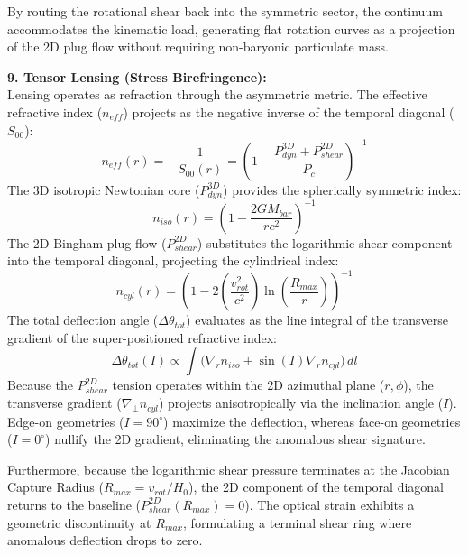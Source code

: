 By routing the rotational shear back into the symmetric sector, the continuum accommodates the kinematic load, generating flat rotation curves as a projection of the 2D plug flow without requiring non-baryonic particulate mass.

\vspace{0.2 cm}

\textbf{9. Tensor Lensing (Stress Birefringence):} \\ 
Lensing operates as refraction through the asymmetric metric. The effective refractive index ($n_{eff}$) projects as the negative inverse of the temporal diagonal ($S_{00}$):
\begin{equation}
    n_{eff}(r) = -\frac{1}{S_{00}(r)} = \left( 1 - \frac{P_{dyn}^{3D} + P_{shear}^{2D}}{P_c} \right)^{-1}
\end{equation}
The 3D isotropic Newtonian core ($P_{dyn}^{3D}$) provides the spherically symmetric index:
\begin{equation}
    n_{iso}(r) = \left( 1 - \frac{2G M_{bar}}{r c^2} \right)^{-1}
\end{equation}
The 2D Bingham plug flow ($P_{shear}^{2D}$) substitutes the logarithmic shear component into the temporal diagonal, projecting the cylindrical index:
\begin{equation}
    n_{cyl}(r) = \left( 1 - 2\left(\frac{v_{rot}^2}{c^2}\right) \ln \left( \frac{R_{max}}{r} \right) \right)^{-1}
\end{equation}
The total deflection angle ($\Delta \theta_{tot}$) evaluates as the line integral of the transverse gradient of the super-positioned refractive index:
\begin{equation}
    \Delta \theta_{tot}(I) \propto \int \Big( \nabla_r n_{iso} + \sin(I) \nabla_r n_{cyl} \Big) \, dl
\end{equation}
Because the $P_{shear}^{2D}$ tension operates within the 2D azimuthal plane ($r, \phi$), the transverse gradient ($\nabla_\perp n_{cyl}$) projects anisotropically via the inclination angle ($I$). Edge-on geometries ($I=90^\circ$) maximize the deflection, whereas face-on geometries ($I=0^\circ$) nullify the 2D gradient, eliminating the anomalous shear signature. 

Furthermore, because the logarithmic shear pressure terminates at the Jacobian Capture Radius ($R_{max} = v_{rot}/H_0$), the 2D component of the temporal diagonal returns to the baseline ($P_{shear}^{2D}(R_{max}) = 0$). The optical strain exhibits a geometric discontinuity at $R_{max}$, formulating a terminal shear ring where anomalous deflection drops to zero. 

